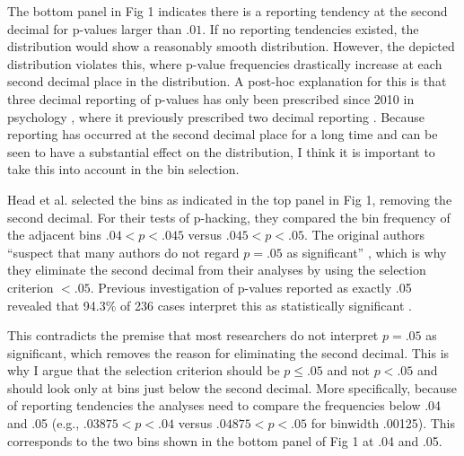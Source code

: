 The bottom panel in Fig 1 indicates there is a reporting tendency at the second decimal for p-values larger than $.01$. If no reporting tendencies existed, the distribution would show a reasonably smooth distribution. However, the depicted distribution violates this, where p-value frequencies drastically increase at each second decimal place in the distribution. A post-hoc explanation for this is that three decimal reporting of p-values has only been prescribed since 2010 in psychology \cite{American_Psychological_Association2010-qe}, where it previously prescribed two decimal reporting \cite{American_Psychological_Association1983-yf, American_Psychological_Association2001-uw}. Because reporting has occurred at the second decimal place for a long time and can be seen to have a substantial effect on the distribution, I think it is important to take this into account in the bin selection.

Head et al. selected the bins as indicated in the top panel in Fig 1, removing the second decimal. For their tests of p-hacking, they compared the bin frequency of the adjacent bins $.04<p<.045$ versus $.045<p<.05$. The original authors “suspect that many authors do not regard $p=.05$ as significant” \cite{Head_2015}, which is why they eliminate the second decimal from their analyses by using the selection criterion $<.05$. Previous investigation of p-values reported as exactly .05 revealed that 94.3\% of 236 cases interpret this as statistically significant \cite{Nuijten2015}. 

This contradicts the premise that most researchers do not interpret $p=.05$ as significant, which removes the reason for eliminating the second decimal. This is why I argue that the selection criterion should be $p\leq.05$ and not $p<.05$ and should look only at bins just below the second decimal. More specifically, because of reporting tendencies the analyses need to compare the frequencies below .04 and .05 (e.g., $.03875<p<.04$ versus $.04875<p<.05$ for binwidth .00125). This corresponds to the two bins shown in the bottom panel of Fig 1 at .04 and .05.
